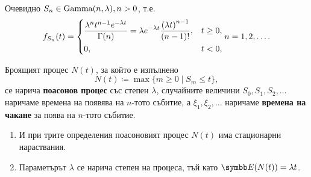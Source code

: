 \documentclass[numbers=endperiod, bibliography=totocnumbered]{scrartcl}
\begin{document}
\begin{definition}
\begin{enumerate}
    Очевидно \( S_n \in \operatorname{Gamma}(n, \lambda), n > 0 \), т.е.
    \begin{align*}
      f_{S_n}(t)
      =
      \begin{dcases}
        \frac {\lambda^n t^{n-1} e^{-\lambda t}} {\Gamma(n)} = \lambda e^{-\lambda t} \frac {{(\lambda t)}^{n-1}} {(n-1)!}, &t \geq 0, \\
        0, &t < 0,
      \end{dcases}
      n = 1, 2, \ldots.
    \end{align*}

    Броящият процес \( N(t) \), за който е изпълнено
    \begin{equation*}
      N(t) \coloneqq \max \{ m \geq 0 \mid S_m \leq t \},
    \end{equation*}
    се нарича \textbf{поасонов процес} със степен \( \lambda \), случайните величини \( S_0, S_1, S_2, \ldots \) наричаме времена на появява на \( n \)-тото събитие, а \( \xi_1, \xi_2, \ldots \) наричаме \textbf{времена на чакане} за поява на \( n \)-тото събитие.
  \end{enumerate}
\end{definition}

\begin{remark}
  \mbox{}
  \begin{enumerate}
    \item И при трите определения поасоновият процес \( N(t) \) има стационарни нараствания.
    \item Параметърът \( \lambda \) се нарича степен на процеса, тъй като \( \Expect(N(t)) = \lambda t \).
  \end{enumerate}
\end{remark}
\end{document}
